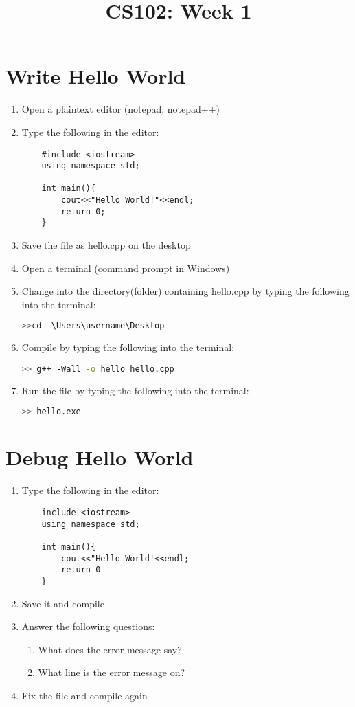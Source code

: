 \documentclass{article}
\begin{document}
\title{CS102: Week 1}

\maketitle

\section*{Write Hello World}
\begin{enumerate}
\item Open a plaintext editor (notepad, notepad++)
\item Type the following in the editor:
	\begin{lstlisting}
	#include <iostream>
	using namespace std;
	
	int main(){
		cout<<"Hello World!"<<endl;
		return 0;
	}
	\end{lstlisting}
\item Save the file as hello.cpp on the desktop
\item Open a terminal (command prompt in Windows)
\item Change into the directory(folder) containing hello.cpp by typing the following into the terminal:
	\begin{lstlisting}[language=bash]
	>>cd  \Users\username\Desktop
	\end{lstlisting}
\item Compile by typing the following into the terminal:
	\begin{lstlisting}[language=bash]
	>> g++ -Wall -o hello hello.cpp
	\end{lstlisting}
\item Run the file by typing the following into the terminal:
	\begin{lstlisting}[language=bash]
	>> hello.exe
	\end{lstlisting}

\end{enumerate}

\section*{Debug Hello World}
\begin{enumerate}
\item Type the following in the editor:
	\begin{lstlisting}
	include <iostream>
	using namespace std;
	
	int main(){
		cout<<"Hello World!<<endl;
		return 0
	}
	\end{lstlisting}
\item Save it and compile
\\
\item Answer the following questions:
	\begin{enumerate}
		\item What does the error message say?
		\item What line is the error message on?
	\end{enumerate}
\item Fix the file and compile again
\end{enumerate}
\end{document}
